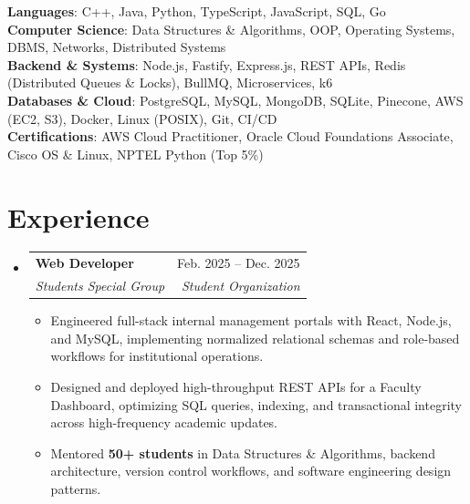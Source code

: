 \documentclass[letterpaper,10.5pt]{article}
\makeatletter
\newcommand{\resumeItem}[1]{
  \item\small{#1\vspace{-1pt}}
}
\newcommand{\resumeSubheading}[4]{
  \vspace{-1pt}\item
  \begin{tabular*}{0.97\textwidth}[t]{l@{\extracolsep{\fill}}r}
    \textbf{#1} & #2 \\
    \textit{\small#3} & \textit{\small#4} \\
  \end{tabular*}
  \vspace{-3pt}
}
\newcommand{\resumeSubHeadingListStart}{
\begin{itemize}[
    leftmargin=0.15in,
    label={},
    itemsep=2pt,
    parsep=0pt,
    topsep=3pt,
    partopsep=0pt
]
}
\newcommand{\resumeSubHeadingListEnd}{
\end{itemize}
\vspace{-2pt}
}
\newcommand{\resumeItemListStart}{
\begin{itemize}[
    itemsep=1pt,
    parsep=0pt,
    topsep=1pt,
    partopsep=0pt,
    leftmargin=0.18in
]
}
\newcommand{\resumeItemListEnd}{
\end{itemize}
\vspace{-2pt}
}
\makeatother
\begin{document}
\begin{itemize}[
    leftmargin=0.15in,
    label={},
    itemsep=1pt,
    parsep=0pt,
    topsep=1pt
]

\small{\item{
\textbf{Languages}{: C++, Java, Python, TypeScript, JavaScript, SQL, Go} \\
\textbf{Computer Science}{: Data Structures \& Algorithms, OOP, Operating Systems, DBMS, Networks, Distributed Systems} \\
\textbf{Backend \& Systems}{: Node.js, Fastify, Express.js, REST APIs, Redis (Distributed Queues \& Locks), BullMQ, Microservices, k6} \\
\textbf{Databases \& Cloud}{: PostgreSQL, MySQL, MongoDB, SQLite, Pinecone, AWS (EC2, S3), Docker, Linux (POSIX), Git, CI/CD} \\
\textbf{Certifications}{: AWS Cloud Practitioner, Oracle Cloud Foundations Associate, Cisco OS \& Linux, NPTEL Python (Top 5\%)}
}}

\end{itemize}

\vspace{-5pt}

\section{Experience}

\resumeSubHeadingListStart

\resumeSubheading
{Web Developer}{Feb. 2025 -- Dec. 2025}
{Students Special Group}{Student Organization}

\resumeItemListStart

    \resumeItem{Engineered full-stack internal management portals with React, Node.js, and MySQL, implementing normalized relational schemas and role-based workflows for institutional operations.}

    \resumeItem{Designed and deployed high-throughput REST APIs for a Faculty Dashboard, optimizing SQL queries, indexing, and transactional integrity across high-frequency academic updates.}

    \resumeItem{Mentored \textbf{50+ students} in Data Structures \& Algorithms, backend architecture, version control workflows, and software engineering design patterns.}

\resumeItemListEnd

\resumeSubHeadingListEnd

\end{document}
